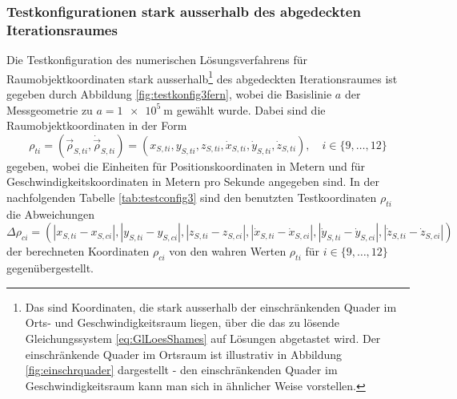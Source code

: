 \documentclass[a4paper,12pt]{article}
\numberwithin{equation}{section}
\begin{document}
\subsubsection{Testkonfigurationen stark ausserhalb des abgedeckten Iterationsraumes}\label{sec:testkonfig3}
Die Testkonfiguration des numerischen Lösungsverfahrens für Raumobjektkoordinaten stark ausserhalb\footnote{Das sind Koordinaten, die stark ausserhalb der einschränkenden Quader im Orts- und Geschwindigkeitsraum liegen, über die das zu lösende Gleichungssystem \eqref{eq:GlLoesShames} auf Lösungen abgetastet wird. Der einschränkende Quader im Ortsraum ist illustrativ in Abbildung \ref{fig:einschrquader} dargestellt - den einschränkenden Quader im Geschwindigkeitsraum kann man sich in ähnlicher Weise vorstellen.} des abgedeckten Iterationsraumes ist gegeben durch Abbildung \ref{fig:testkonfig3fern}, wobei die Basislinie $a$ der Messgeometrie zu $a = \SI{1e5}{\meter}$ gewählt wurde. Dabei sind die Raumobjektkoordinaten in der Form \begin{equation}
\rho_{ti} = (\vec{\rho}_{S,ti},\dot{\vec{\rho}}_{S,ti}) =  (x_{S,ti},y_{S,ti},z_{S,ti},\dot{x}_{S,ti},\dot{y}_{S,ti},\dot{z}_{S,ti}), \quad i \in \{9,\dots,12\}
\end{equation} gegeben, wobei die Einheiten für Positionskoordinaten in Metern und für Geschwindigkeitskoordinaten in Metern pro Sekunde angegeben sind. In der nachfolgenden Tabelle \ref{tab:testconfig3} sind den benutzten Testkoordinaten $\rho_{ti}$ die Abweichungen \begin{equation} \Delta \rho_{ci} = (|x_{S,ti}-x_{S,ci}|,|y_{S,ti}-y_{S,ci}|,|z_{S,ti}-z_{S,ci}|,|\dot{x}_{S,ti}-\dot{x}_{S,ci}|,|\dot{y}_{S,ti}-\dot{y}_{S,ci}|,|\dot{z}_{S,ti}-\dot{z}_{S,ci}|)\end{equation} der berechneten Koordinaten $\rho_{ci}$ von den wahren Werten $\rho_{ti}$ für $ i \in \{9,\dots,12\}$ gegenübergestellt.
\end{document}
